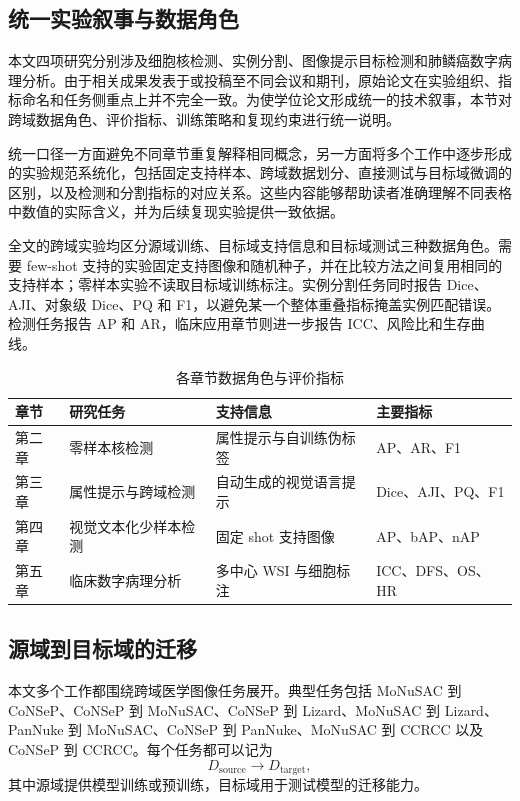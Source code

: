 \subsection{统一实验叙事与数据角色}
本文四项研究分别涉及细胞核检测、实例分割、图像提示目标检测和肺鳞癌数字病理分析。由于相关成果发表于或投稿至不同会议和期刊，原始论文在实验组织、指标命名和任务侧重点上并不完全一致。为使学位论文形成统一的技术叙事，本节对跨域数据角色、评价指标、训练策略和复现约束进行统一说明。

统一口径一方面避免不同章节重复解释相同概念，另一方面将多个工作中逐步形成的实验规范系统化，包括固定支持样本、跨域数据划分、直接测试与目标域微调的区别，以及检测和分割指标的对应关系。这些内容能够帮助读者准确理解不同表格中数值的实际含义，并为后续复现实验提供一致依据。


全文的跨域实验均区分源域训练、目标域支持信息和目标域测试三种数据角色。需要 few-shot 支持的实验固定支持图像和随机种子，并在比较方法之间复用相同的支持样本；零样本实验不读取目标域训练标注。实例分割任务同时报告 Dice、AJI、对象级 Dice、PQ 和 F1，以避免某一个整体重叠指标掩盖实例匹配错误。检测任务报告 AP 和 AR，临床应用章节则进一步报告 ICC、风险比和生存曲线。

\begin{table}[htbp]
  \centering
  \caption{各章节数据角色与评价指标}
  \label{tab:crosschapter_protocol}
  \small
  \begin{tabular}{llll}
    \toprule
    章节 & 研究任务 & 支持信息 & 主要指标 \\
    \midrule
    第二章 & 零样本核检测 & 属性提示与自训练伪标签 & AP、AR、F1 \\
    第三章 & 属性提示与跨域检测 & 自动生成的视觉语言提示 & Dice、AJI、PQ、F1 \\
    第四章 & 视觉文本化少样本检测 & 固定 shot 支持图像 & AP、bAP、nAP \\
    第五章 & 临床数字病理分析 & 多中心 WSI 与细胞标注 & ICC、DFS、OS、HR \\
    \bottomrule
  \end{tabular}
\end{table}

\subsection{源域到目标域的迁移}
本文多个工作都围绕跨域医学图像任务展开。典型任务包括 MoNuSAC 到 CoNSeP、CoNSeP 到 MoNuSAC、CoNSeP 到 Lizard、MoNuSAC 到 Lizard、PanNuke 到 MoNuSAC、CoNSeP 到 PanNuke、MoNuSAC 到 CCRCC 以及 CoNSeP 到 CCRCC。每个任务都可以记为
\[
D_{\text{source}} \rightarrow D_{\text{target}},
\]
其中源域提供模型训练或预训练，目标域用于测试模型的迁移能力。

